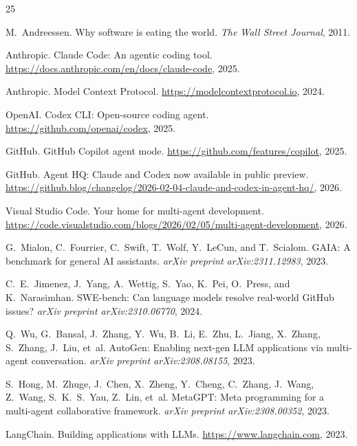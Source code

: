 \begin{thebibliography}{25}

M.~Andreessen.
Why software is eating the world.
\textit{The Wall Street Journal}, 2011.

Anthropic.
Claude Code: An agentic coding tool.
\url{https://docs.anthropic.com/en/docs/claude-code}, 2025.

Anthropic.
Model Context Protocol.
\url{https://modelcontextprotocol.io}, 2024.

OpenAI.
Codex CLI: Open-source coding agent.
\url{https://github.com/openai/codex}, 2025.

GitHub.
GitHub Copilot agent mode.
\url{https://github.com/features/copilot}, 2025.

GitHub.
Agent HQ: Claude and Codex now available in public preview.
\url{https://github.blog/changelog/2026-02-04-claude-and-codex-in-agent-hq/}, 2026.

Visual Studio Code.
Your home for multi-agent development.
\url{https://code.visualstudio.com/blogs/2026/02/05/multi-agent-development}, 2026.

G.~Mialon, C.~Fourrier, C.~Swift, T.~Wolf, Y.~LeCun, and T.~Scialom.
GAIA: A benchmark for general AI assistants.
\textit{arXiv preprint arXiv:2311.12983}, 2023.

C.~E.~Jimenez, J.~Yang, A.~Wettig, S.~Yao, K.~Pei, O.~Press, and K.~Narasimhan.
SWE-bench: Can language models resolve real-world GitHub issues?
\textit{arXiv preprint arXiv:2310.06770}, 2024.

Q.~Wu, G.~Bansal, J.~Zhang, Y.~Wu, B.~Li, E.~Zhu, L.~Jiang, X.~Zhang, S.~Zhang, J.~Liu, et~al.
AutoGen: Enabling next-gen LLM applications via multi-agent conversation.
\textit{arXiv preprint arXiv:2308.08155}, 2023.

S.~Hong, M.~Zhuge, J.~Chen, X.~Zheng, Y.~Cheng, C.~Zhang, J.~Wang, Z.~Wang, S.~K.~S.~Yau, Z.~Lin, et~al.
MetaGPT: Meta programming for a multi-agent collaborative framework.
\textit{arXiv preprint arXiv:2308.00352}, 2023.

LangChain.
Building applications with LLMs.
\url{https://www.langchain.com}, 2023.


\end{thebibliography}
